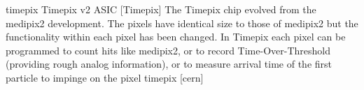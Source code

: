 \newglsXequipment%
{timepix}%
{Timepix v2 ASIC}%
[Timepix]%
{The Timepix chip evolved from the \gls{medipix2} development. The pixels have identical size to those of \gls{medipix2} but the functionality within each pixel has been changed. In Timepix each pixel can be programmed to count hits like \gls{medipix2}, or to record Time-Over-Threshold (providing rough analog information), or to measure arrival time of the first particle to impinge on the pixel}%
{timepix}%
[cern]%